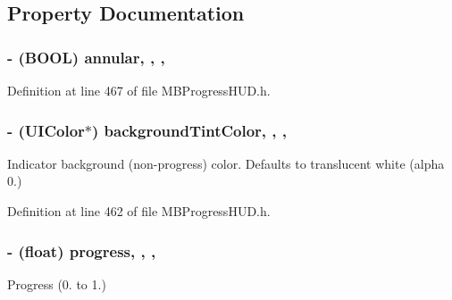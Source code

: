 \subsection{Property Documentation}
\hypertarget{interface_m_b_round_progress_view_abac11853dafb3f11426dab6d42834f9c}{
\subsubsection[{annular}]{\setlength{\rightskip}{0pt plus 5cm}-\/ (B\+O\+O\+L) annular\hspace{0.3cm}{\ttfamily [read]}, {\ttfamily [write]}, {\ttfamily [nonatomic]}, {\ttfamily [assign]}}}\label{interface_m_b_round_progress_view_abac11853dafb3f11426dab6d42834f9c}


Definition at line 467 of file M\+B\+Progress\+H\+U\+D.\+h.

\hypertarget{interface_m_b_round_progress_view_ab111d2fa027158e7c21ad411767d193a}{
\subsubsection[{background\+Tint\+Color}]{\setlength{\rightskip}{0pt plus 5cm}-\/ (U\+I\+Color$\ast$) background\+Tint\+Color\hspace{0.3cm}{\ttfamily [read]}, {\ttfamily [write]}, {\ttfamily [nonatomic]}, {\ttfamily [assign]}}}\label{interface_m_b_round_progress_view_ab111d2fa027158e7c21ad411767d193a}
Indicator background (non-\/progress) color. Defaults to translucent white (alpha 0.) 

Definition at line 462 of file M\+B\+Progress\+H\+U\+D.\+h.

\hypertarget{interface_m_b_round_progress_view_af92eeb35944c81f406571bc353dc5d5a}{
\subsubsection[{progress}]{\setlength{\rightskip}{0pt plus 5cm}-\/ (float) progress\hspace{0.3cm}{\ttfamily [read]}, {\ttfamily [write]}, {\ttfamily [nonatomic]}, {\ttfamily [assign]}}}\label{interface_m_b_round_progress_view_af92eeb35944c81f406571bc353dc5d5a}
Progress (0. to 1.) 

